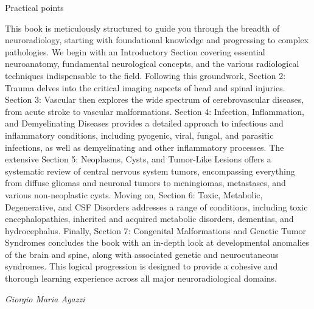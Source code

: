 \begin{tcolorbox}[colback=purple!5!white,colframe=purple!75!white,title=Practical points]
	Practical points
\end{tcolorbox}

This book is meticulously structured to guide you through the breadth of neuroradiology, starting with foundational knowledge and progressing to complex pathologies. We begin with an Introductory Section covering essential neuroanatomy, fundamental neurological concepts, and the various radiological techniques indispensable to the field. Following this groundwork, Section 2: Trauma delves into the critical imaging aspects of head and spinal injuries. Section 3: Vascular then explores the wide spectrum of cerebrovascular diseases, from acute stroke to vascular malformations. Section 4: Infection, Inflammation, and Demyelinating Diseases provides a detailed approach to infectious and inflammatory conditions, including pyogenic, viral, fungal, and parasitic infections, as well as demyelinating and other inflammatory processes. The extensive Section 5: Neoplasms, Cysts, and Tumor-Like Lesions offers a systematic review of central nervous system tumors, encompassing everything from diffuse gliomas and neuronal tumors to meningiomas, metastases, and various non-neoplastic cysts. Moving on, Section 6: Toxic, Metabolic, Degenerative, and CSF Disorders addresses a range of conditions, including toxic encephalopathies, inherited and acquired metabolic disorders, dementias, and hydrocephalus. Finally, Section 7: Congenital Malformations and Genetic Tumor Syndromes concludes the book with an in-depth look at developmental anomalies of the brain and spine, along with associated genetic and neurocutaneous syndromes. This logical progression is designed to provide a cohesive and thorough learning experience across all major neuroradiological domains.

\textit{Giorgio Maria Agazzi}